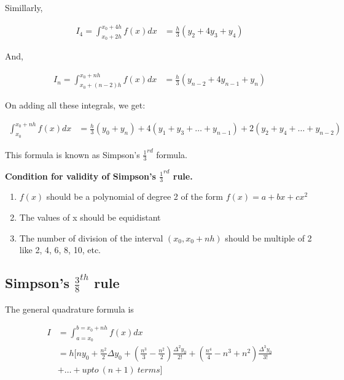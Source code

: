 \documentclass{article}
\begin{document}
              Simillarly,
              
              \begin{align*}
                I_4=\int_{x_0+2h}^{x_0+4h}f(x)dx &= \frac{h}{3}(y_2+4y_3+y_4)
              \end{align*}

              And,

              \begin{align*}
                I_n=\int_{x_0+(n-2)h}^{x_0+nh}f(x)dx &= \frac{h}{3}(y_{n-2}+4y_{n-1}+y_n)
              \end{align*}
              
              On adding all these integrals, we get:
              
              \begin{align*}
                \int_{x_0}^{x_0+nh}f(x)dx &= \frac{h}{3}(y_0+y_n)+4(y_1+y_3+\dots+y_{n-1})+2(y_2+y_4+\dots+y_{n-2})
              \end{align*}

              This formula is known as Simpson's $\frac{1}{3}^{rd}$ formula.
              
              \textbf{Condition for validity of Simpson's $\frac{1}{3}^{rd}$ rule.}

              \begin{enumerate}
                \item $f(x)$ should be a polynomial of degree 2 of the form $f(x)=a+bx+cx^2$
                \item The values of x should be equidistant
                \item The number of division of the interval $(x_0,x_0+nh)$ should be multiple of 2 like 2, 4, 6, 8, 10, etc.
              \end{enumerate}
            
            \subsection{Simpson's $\frac{3}{8}^{th}$ rule}
              The general quadrature formula is 

              \begin{align*}
                I &=\int_{a=x_0}^{b=x_0+nh}f(x)dx\\
                  &= h[ny_0+\frac{n^2}{2}\Delta y_0+(\frac{n^3}{3}-\frac{n^2}{2})\frac{\Delta^2y_0}{2!}+(\frac{n^4}{4}-n^3+n^2)\frac{\Delta^3y_0}{3!}\\
                  &+ \dots+upto\ (n+1)\ terms]
              \end{align*}
\end{document}
